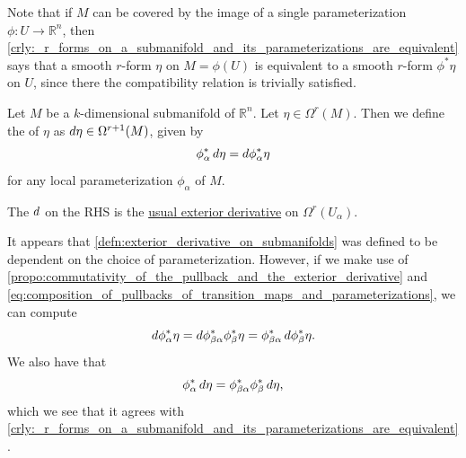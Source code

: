 \documentclass[notoc,notitlepage]{tufte-book}
\begin{document}
\begin{remark}\label{remark:smooth_pullbacks_of_r_forms_on_submanifolds_of_a_single_parameterization}
  Note that if $M$ can be covered by the image of a single parameterization $\phi
  : U \to \mathbb{R}^n$, then
  \cref{crly:_r_forms_on_a_submanifold_and_its_parameterizations_are_equivalent}
  says that a smooth $r$-form $\eta$ on $M  = \phi(U)$ is equivalent to a smooth
  $r$-form $\phi^* \eta$ on $U$, since there the compatibility relation is
  trivially satisfied.
\end{remark}

\begin{defn}\label{defn:exterior_derivative_on_submanifolds}
  Let $M$ be a $k$-dimensional submanifold of $\mathbb{R}^n$. Let $\eta \in
  \Omega^r(M)$. Then we define the  of $\eta$ as
  $\mathop{}\!d{\eta} \in \Omega^{r+1}(M)$, given by
  \begin{equation}\label{eq:exterior_derivative_on_submanifolds}
    \phi_\alpha^* \mathop{}\!d{\eta} = \mathop{}\!d{\phi_\alpha^* \eta}
  \end{equation}
  for any local parameterization $\phi_\alpha$ of $M$.
\end{defn}

\begin{note}
  The $\mathop{}\!d{}$ on the RHS is the \hyperref[defn:exterior_derivative]{usual
  exterior derivative} on $\Omega^r(U_\alpha)$.
\end{note}

\begin{remark}
  It appears that \cref{defn:exterior_derivative_on_submanifolds} was defined to
  be dependent on the choice of parameterization. However, if we make use of
  \cref{propo:commutativity_of_the_pullback_and_the_exterior_derivative} and
  \cref{eq:composition_of_pullbacks_of_transition_maps_and_parameterizations}, we
  can compute
  \begin{equation*}
    \mathop{}\!d{\phi_\alpha^* \eta} = \mathop{}\!d{\phi_{\beta\alpha}^* \phi_\beta^* \eta}
    = \phi_{\beta\alpha}^* \mathop{}\!d{\phi_\beta^* \eta}.
  \end{equation*}
  We also have that
  \begin{equation*}
    \phi_\alpha^* \mathop{}\!d{\eta} = \phi_{\beta\alpha}^* \phi_{\beta}^* \mathop{}\!d{\eta},
  \end{equation*}
  which we see that it agrees with
  \cref{crly:_r_forms_on_a_submanifold_and_its_parameterizations_are_equivalent}.
\end{remark}
\end{document}

